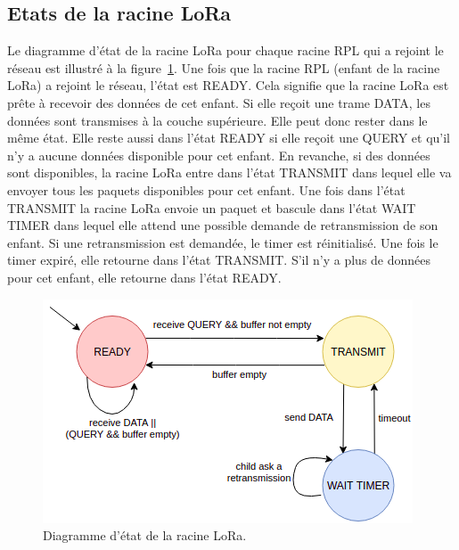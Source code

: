 \subsection*{Etats de la racine LoRa}
    Le diagramme d'état de la racine LoRa pour chaque racine RPL qui a rejoint le réseau est 
    illustré à la figure~\ref{fig:archi-state-lora}. Une fois que la racine RPL (enfant de la 
    racine LoRa) a rejoint le réseau, l'état est READY. Cela signifie que la racine LoRa est prête 
    à recevoir des données de cet enfant. Si elle reçoit une trame DATA, les données sont 
    transmises à la couche supérieure. Elle peut donc rester dans le même état. Elle reste aussi 
    dans l'état READY si elle reçoit une QUERY et qu'il n'y a aucune données disponible pour cet 
    enfant. En revanche, si des données sont disponibles, la racine LoRa entre dans l'état TRANSMIT 
    dans lequel elle va envoyer tous les paquets disponibles pour cet enfant. Une fois dans l'état 
    TRANSMIT la racine LoRa envoie un paquet et bascule dans l'état WAIT TIMER dans lequel elle 
    attend une possible demande de retransmission de son enfant. Si une retransmission est 
    demandée, le timer est réinitialisé. Une fois le timer expiré, elle retourne dans l'état 
    TRANSMIT. S'il n'y a plus de données pour cet enfant, elle retourne dans l'état READY.


    \begin{figure}[H]
        \centering
        \includegraphics[scale=0.5]{res/pictures/loramac-loraroot-state.drawio.png}
        \caption{Diagramme d'état de la racine LoRa.}
        \label{fig:archi-state-lora}
    \end{figure}

